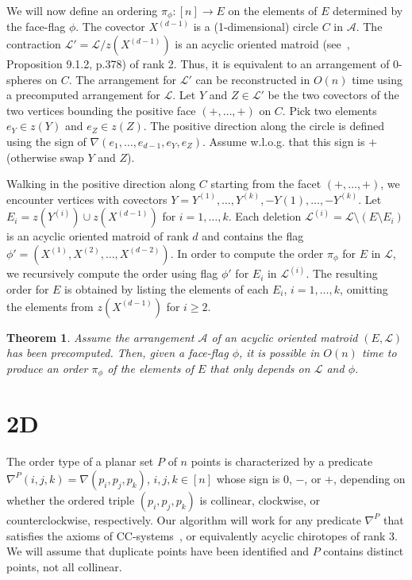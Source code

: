 \documentclass[leqno,12pt]{article}
\def\L{\mathcal{L}}
\def\A{\mathcal{A}}
\newtheorem{theorem}{Theorem}
\begin{document}
We will now define an ordering $\pi_\phi:[n]\rightarrow E$ on the
elements of $E$ determined by the face-flag $\phi$.
The covector $X^{(d-1)}$ is a (1-dimensional) circle $C$ in $\A$.
The contraction $\L' = \L/z(X^{(d-1)})$ is an acyclic oriented matroid 
(see~\cite{Bjorner:Oriented}, Proposition
9.1.2,  p.378) of rank 2. Thus, it is equivalent to an
arrangement of 0-spheres on $C$. The arrangement for $\L'$ can
be reconstructed in $O(n)$ time using a precomputed
arrangement for $\L$.
Let $Y$ and $Z \in \L'$ be the two covectors of the two vertices
bounding the positive face $(+,\ldots,+)$ on $C$.
Pick two elements $e_Y\in z(Y)$ and $e_Z\in z(Z)$. The positive
direction along the circle is defined using the sign of
$\nabla(e_1,\ldots,e_{d-1},e_Y,e_Z)$. Assume w.l.o.g. that this sign is
$+$ (otherwise swap $Y$ and $Z$). 

Walking in the positive direction along $C$ starting from the facet
$(+,\ldots,+)$, we encounter vertices with covectors
$Y=Y^{(1)},\ldots,Y^{(k)},-Y{(1)},\ldots,-Y^{(k)}$. Let 
$E_i = z(Y^{(i)})\cup z(X^{(d-1)})$ for $i=1,\ldots,k$. 
Each deletion $\L^{(i)} = \L\setminus(E\setminus E_i)$ is an acyclic oriented
matroid of rank $d$ and contains the flag
$\phi'=(X^{(1)},X^{(2)},\ldots,X^{(d-2)})$.
In order to compute the order $\pi_\phi$ for $E$ in $\L$, we
recursively compute the order using flag $\phi'$ for $E_i$ in
$\L^{(i)}$. The resulting order for $E$ is obtained by listing the
elements of each $E_i$, $i=1,\ldots,k$, omitting the elements from
$z(X^{(d-1)})$ for $i\geq 2$.


\begin{theorem}
Assume the arrangement $\A$ of an acyclic oriented matroid $(E,\L)$ has been
precomputed. 
Then, given a face-flag $\phi$, it is possible in $O(n)$ time to
produce an order $\pi_\phi$ of the elements of $E$ that only depends
on $\L$ and $\phi$. 
\end{theorem}



\section{2D}
The order type of a planar set $P$ of $n$ points
is characterized by a predicate $\nabla^P(i,j,k) = \nabla(p_i,p_j,p_k)$, $i,j,k\in [n]$ whose
sign is $0$, $-$, or $+$, depending on whether the ordered triple
$(p_i,p_j,p_k)$ is collinear, clockwise, or counterclockwise,
respectively.
Our algorithm will work for any predicate $\nabla^P$ that
satisfies the axioms of CC-systems~\cite{DBLP:books/sp/Knuth92}, or equivalently acyclic chirotopes
of rank 3.
 We will assume that duplicate points have been
 identified and  $P$ contains
 distinct points, not all collinear. \\
\end{document}
